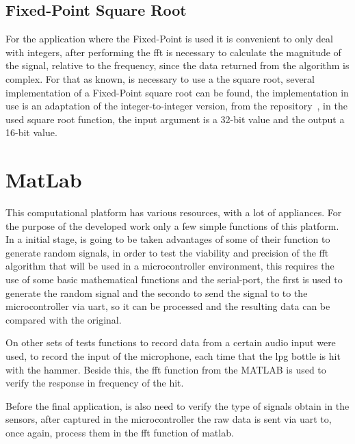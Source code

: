 \subsection{Fixed-Point Square Root}
For the application where the Fixed-Point is used it is convenient to only deal with integers, after performing the \acrshort{fft} is necessary to calculate the magnitude of the signal, relative to the frequency, since the data returned from the algorithm is complex. For that as known, is necessary to use a the square root, several implementation of a Fixed-Point square root can be found, the implementation in use is an adaptation of the integer-to-integer version, from the repository~\cite{ChmikeFpsqrta}, in the used square root function, the input argument is a 32-bit value and the output a 16-bit value.

\section{MatLab}
This computational platform has various resources, with a lot of appliances. For the purpose of the developed work only a few simple functions of this platform. In a initial stage, is going to be taken advantages of some of their function to generate random signals, in order to test the viability and precision of the \acrshort{fft} algorithm that will be used in a microcontroller environment, this requires the use of some basic mathematical functions and the serial-port, the first is used to generate the random signal and the secondo to send the signal to to the microcontroller via \acrshort{uart}, so it can be processed and the resulting data can be compared with the original.

On other sets of tests functions to record data from a certain audio input were used, to record the input of the microphone, each time that the \acrshort{lpg} bottle is hit with the hammer. Beside this, the \acrshort{fft} function from the MATLAB is used to verify the response in frequency of the hit.

Before the final application, is also need to verify the type of signals obtain in the sensors, after captured in the microcontroller the raw data is sent via \acrshort{uart} to, once again, process them in the \acrshort{fft} function of \acrshort{matlab}. 
